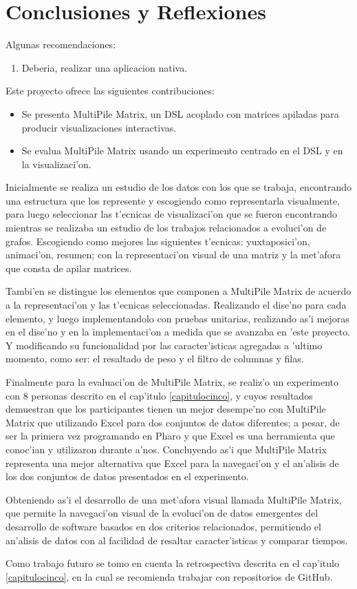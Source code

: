 \chapter{Conclusiones y Reflexiones}
\label{capituloseis}
Algunas recomendaciones:
\begin{enumerate}
\item Deberia, realizar una aplicacion nativa.
\end{enumerate}
Este proyecto ofrece las siguientes contribuciones:
\begin{itemize}
\item Se presenta MultiPile Matrix, un DSL acoplado con matrices apiladas para producir visualizaciones interactivas.
\item Se evalua MultiPile Matrix usando un experimento centrado en el DSL y en la visualizaci'on.
\end{itemize}

Inicialmente se realiza un estudio de los datos con los que se trabaja, encontrando una estructura que los represente y escogiendo como representarla visualmente, para luego seleccionar las t'ecnicas de visualizaci'on que se fueron encontrando mientras se realizaba un estudio de los trabajos relacionados a evoluci'on de grafos. Escogiendo como mejores las siguientes t'ecnicas: yuxtaposici'on, animaci'on, resumen; con la representaci'on visual de una matriz y la met'afora que consta de apilar matrices.

Tambi'en se distingue los elementos que componen a MultiPile Matrix de acuerdo a la representaci'on y las t'ecnicas seleccionadas. Realizando el dise'no para cada elemento, y luego implementandolo con pruebas unitarias, realizando as'i mejoras en el dise'no y en la implementaci'on a medida que se avanzaba en 'este proyecto. Y modificando su funcionalidad por las caracter'isticas agregadas a 'ultimo momento, como ser: el resaltado de peso y el filtro de columnas y filas.

Finalmente para la evaluaci'on de MultiPile Matrix, se realiz'o un experimento con 8 personas descrito en el cap'itulo \ref{capitulocinco}, y cuyos resultados demuestran que los participantes tienen un mejor desempe'no con MultiPile Matrix que utilizando Excel para dos conjuntos de datos diferentes; a pesar, de ser la primera vez programando en Pharo y que Excel es una herramienta que conoc'ian y utilizaron durante a'nos. Concluyendo as'i que MultiPile Matrix representa una mejor alternativa que Excel para la navegaci'on y el an'alisis de los dos conjuntos de datos presentados en el experimento.

Obteniendo as'i el desarrollo de una met'afora visual llamada MultiPile Matrix, que permite la navegaci'on visual de la evoluci'on de datos emergentes del desarrollo de software basados en dos criterios relacionados, permitiendo el an'alisis de datos con al facilidad de resaltar caracter'isticas y comparar tiempos.

Como trabajo futuro se tomo en cuenta la retrospectiva descrita en el cap'itulo \ref{capitulocinco}, en la cual se recomienda trabajar con repositorios de GitHub.